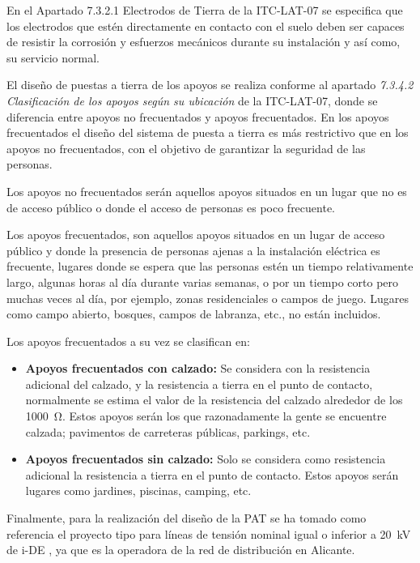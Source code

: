 En el Apartado 7.3.2.1 Electrodos de Tierra de la ITC-LAT-07 se especifica que los electrodos que estén directamente en contacto con el suelo deben ser capaces de resistir la corrosión y esfuerzos mecánicos durante su instalación y así como, su servicio normal.

El diseño de puestas a tierra de los apoyos se realiza conforme al apartado \textit{7.3.4.2 Clasificación de los apoyos según su ubicación} de la ITC-LAT-07, donde se diferencia entre apoyos no frecuentados y apoyos frecuentados. En los apoyos frecuentados el diseño del sistema de puesta a tierra es más restrictivo que en los apoyos no frecuentados, con el objetivo de garantizar la seguridad de las personas.

Los apoyos no frecuentados serán aquellos apoyos situados en un lugar que no es de acceso público o donde el acceso de personas es poco frecuente. 

Los apoyos frecuentados, son aquellos apoyos situados en un lugar de acceso público y donde la presencia de personas ajenas a la instalación eléctrica es frecuente, lugares donde se espera que las personas estén un tiempo relativamente largo, algunas horas al día durante varias semanas, o por un tiempo corto pero muchas veces al día, por ejemplo, zonas residenciales o campos de juego. Lugares como campo abierto, bosques, campos de labranza, etc., no están incluidos.

Los apoyos frecuentados a su vez se clasifican en:
\begin{itemize}
    \item \textbf{Apoyos frecuentados con calzado:} Se considera con la resistencia adicional del calzado, y la resistencia a tierra en el punto de contacto, normalmente se estima el valor de la resistencia del calzado alrededor de los \SI{1000}{\ohm}. Estos apoyos serán los que razonadamente la gente se encuentre calzada; pavimentos de carreteras públicas, parkings, etc. 
    \item \textbf{Apoyos frecuentados sin calzado:} Solo se considera como resistencia adicional la resistencia a tierra en el punto de contacto. Estos apoyos serán lugares como jardines, piscinas, camping, etc.
\end{itemize}

Finalmente, para la realización del diseño de la \ac{PAT} se ha tomado como referencia el proyecto tipo para líneas de tensión nominal igual o inferior a \SI{20}{\kilo\volt} de \ac{i-DE} \cite{IDE_MT22335_2014}, ya que es la operadora de la red de distribución en Alicante.

